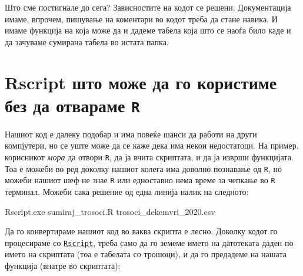 \documentclass[
]{book}
\newenvironment{Shaded}{\begin{snugshade}}{\end{snugshade}}
\newcommand{\ExtensionTok}[1]{#1}
\newcommand{\NormalTok}[1]{#1}
\begin{document}
Што сме постигнале до сега? Зависностите на кодот се решени. Документација имаме, впрочем, пишување на коментари во кодот треба да стане навика. И имаме функција на која може да и дадеме табела која што се наоѓа било каде и да зачуваме сумирана табела во истата папка.

\hypertarget{rscript-ux448ux442ux43e-ux43cux43eux436ux435-ux434ux430-ux433ux43e-ux43aux43eux440ux438ux441ux442ux438ux43cux435-ux431ux435ux437-ux434ux430-ux43eux442ux432ux430ux440ux430ux43cux435-r}{%
\section{\texorpdfstring{Rscript што може да го користиме без да отвараме \texttt{R}}{Rscript што може да го користиме без да отвараме R}}\label{rscript-ux448ux442ux43e-ux43cux43eux436ux435-ux434ux430-ux433ux43e-ux43aux43eux440ux438ux441ux442ux438ux43cux435-ux431ux435ux437-ux434ux430-ux43eux442ux432ux430ux440ux430ux43cux435-r}}

Нашиот код е далеку подобар и има повеќе шанси да работи на други компјутери, но се уште може да се каже дека има некои недостатоци. На пример, корисникот \emph{мора} да отвори \texttt{R}, да ја вчита скриптата, и да ја изврши функцијата. Тоа е можеби во ред доколку нашиот колега има доволно познавање од \texttt{R}, но можеби нашиот шеф не знае \texttt{R} или едноставно нема време за чепкање во \texttt{R} терминал. Можеби сака решение од една линија налик на следното:

\begin{Shaded}
\begin{Highlighting}[]
\ExtensionTok{Rscript.exe}\NormalTok{ sumiraj\_trosoci.R trosoci\_dekemvri\_2020.csv}
\end{Highlighting}
\end{Shaded}

Да го конвертираме нашиот код во ваква скрипта е лесно. Доколку кодот го процесираме со \href{https://www.rdocumentation.org/packages/utils/versions/3.6.2/topics/Rscript}{\texttt{Rscript}}, треба само да го земеме името на датотеката даден по името на скриптата (тоа е табелата со трошоци), и да го предадеме на нашата функција (внатре во скриптата):
\end{document}
